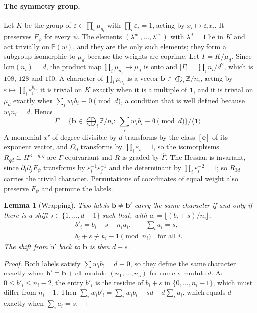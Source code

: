 \documentclass[11pt]{amsart}
\newtheorem{lemma}[theorem]{Lemma}
\theoremstyle{definition}
\theoremstyle{remark}
\newcommand{\Z}{\mathbb{Z}}
\newcommand{\PP}{\mathbb{P}}
\newcommand{\bb}{\mathbf{b}}
\newcommand{\ee}{\mathbf{e}}
\newcommand{\one}{\mathbf{1}}
\begin{document}
\paragraph*{The symmetry group.}
Let $K$ be the group of $\varepsilon\in\prod_i\mu_{n_i}$ with
$\prod_i\varepsilon_i=1$, acting by $x_i\mapsto\varepsilon_ix_i$. It
preserves $F_\psi$ for every $\psi$. The elements
$(\lambda^{w_1},\dots,\lambda^{w_5})$ with $\lambda^d=1$ lie in $K$ and act
trivially on $\PP(w)$, and they are the only such elements; they form a
subgroup isomorphic to $\mu_d$ because the weights are coprime. Let
$\Gamma=K/\mu_d$. Since $\mathrm{lcm}(n_i)=d$, the product map
$\prod_i\mu_{n_i}\to\mu_d$ is onto and $|\Gamma|=\prod_in_i/d^2$, which is
$108$, $128$ and $100$. A character of $\prod_i\mu_{n_i}$ is a vector
$\bb\in\bigoplus_i\Z/n_i$, acting by $\varepsilon\mapsto\prod_i
\varepsilon_i^{b_i}$; it is trivial on $K$ exactly when it is a multiple of
$\one$, and it is trivial on $\mu_d$ exactly when $\sum_iw_ib_i\equiv0
\pmod d$, a condition that is well defined because $w_in_i=d$. Hence
\[
\widehat\Gamma=\Big\{\bb\in\textstyle\bigoplus_i\Z/n_i:\ \sum_iw_ib_i
\equiv0\pmod d\Big\}\Big/\langle\one\rangle .
\]
A monomial $x^{\ee}$ of degree divisible by $d$ transforms by the class
$[\ee]$ of its exponent vector, and $\Omega_0$ transforms by
$\prod_i\varepsilon_i=1$, so the isomorphisms $R_{qd}\cong H^{3-q,q}$ are
$\Gamma$-equivariant and $R$ is graded by $\widehat\Gamma$. The Hessian is
invariant, since $\partial_i\partial_jF_\psi$ transforms by
$\varepsilon_i^{-1}\varepsilon_j^{-1}$ and the determinant by
$\prod_i\varepsilon_i^{-2}=1$; so $R_{3d}$ carries the trivial character.
Permutations of coordinates of equal weight also preserve $F_\psi$ and
permute the labels.

\begin{lemma}[Wrapping]\label{lem:wwrap}
Two labels $\bb\ne\bb'$ carry the same character if and only if there is a
shift $s\in\{1,\dots,d-1\}$ such that, with $a_i=\lfloor(b_i+s)/n_i\rfloor$,
\[
\begin{gathered}
b'_i=b_i+s-n_ia_i,\qquad \sum_ia_i=s,\\
b_i+s\not\equiv n_i-1\pmod{n_i}\quad\text{for all }i .
\end{gathered}
\]
The shift from $\bb'$ back to $\bb$ is then $d-s$.
\end{lemma}

\begin{proof}
Both labels satisfy $\sum w_ib_i=d\equiv0$, so they define the same
character exactly when $\bb'\equiv\bb+s\one$ modulo $(n_1,\dots,n_5)$ for
some $s$ modulo $d$. As $0\le b'_i\le n_i-2$, the entry $b'_i$ is the
residue of $b_i+s$ in $\{0,\dots,n_i-1\}$, which must differ from $n_i-1$.
Then $\sum_iw_ib'_i=\sum_iw_ib_i+sd-d\sum_ia_i$, which equals $d$ exactly
when $\sum_ia_i=s$.
\end{proof}
\end{document}

